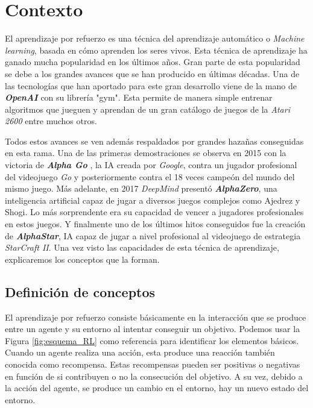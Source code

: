 \section{Contexto}

El aprendizaje por refuerzo es una técnica del aprendizaje automático o \emph{Machine learning}, basada en cómo aprenden los seres vivos. Esta técnica de aprendizaje ha ganado mucha popularidad en los últimos años. Gran parte de esta popularidad se debe a los grandes avances que se han producido en últimas décadas. Una de las tecnologías que han aportado para este gran desarrollo viene de la mano de \textbf{\textit{OpenAI}} \cite {openia} con su librería "gym". Esta permite de manera simple entrenar algoritmos que jueguen y aprendan de un gran catálogo de juegos de la \textit{Atari 2600} entre muchos otros. 

Todos estos avances se ven además respaldados por grandes hazañas conseguidas en esta rama. Una de las primeras demostraciones se observa en 2015 con la victoria de \textbf{\textit{Alpha Go}} \cite {alphago}, la IA creada por \textit{Google}, contra un jugador profesional del videojuego \textit{Go} y posteriormente contra el 18 veces campeón del mundo del mismo juego. Más adelante, en 2017 \textit{DeepMind} \cite {deepmind} presentó \textbf{\textit{AlphaZero}}, una inteligencia artificial capaz de jugar a diversos juegos complejos como Ajedrez y Shogi. Lo más sorprendente era su capacidad de vencer a jugadores profesionales en estos juegos. Y finalmente uno de los últimos hitos conseguidos fue la creación de \textbf{\textit{AlphaStar}}, IA capaz de jugar a nivel profesional al videojuego de estrategia \textit{StarCraft II}. Una vez visto las capacidades de esta técnica de aprendizaje, explicaremos los conceptos que la forman.

\subsection{Definición de conceptos}

El aprendizaje por refuerzo consiste básicamente en la interacción que se produce entre un agente y su entorno al intentar conseguir un objetivo. Podemos usar la Figura \ref {fig:esquema_RL} como referencia para identificar los elementos básicos. Cuando un agente realiza una acción, esta produce una reacción también conocida como recompensa. Estas recompensas pueden ser positivas o negativas en función de si contribuyen o no la consecución del objetivo. A su vez, debido a la acción del agente, se produce un cambio en el entorno, hay un nuevo estado del entorno.

